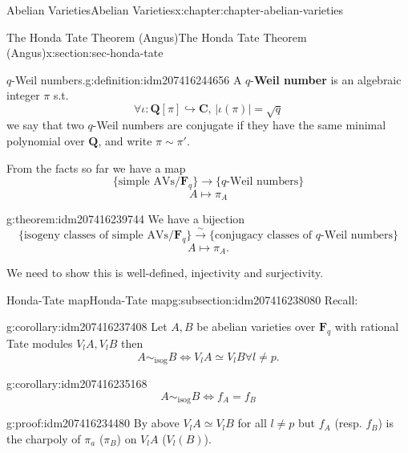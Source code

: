 \documentclass[oneside,10pt,]{book}
\newcommand{\terminology}[1]{\textbf{#1}}
\numberwithin{equation}{section}
\newcommand{\lb}{[}
\newcommand{\rb}{]}
\newcommand{\QQ}{\mathbf{Q}}
\newcommand{\CC}{\mathbf{C}}
\newcommand{\FF}{\mathbf{F}}
\begin{document}
\begin{chapterptx}{Abelian Varieties}{}{Abelian Varieties}{}{}{x:chapter:chapter-abelian-varieties}
\begin{sectionptx}{The Honda Tate Theorem (Angus)}{}{The Honda Tate Theorem (Angus)}{}{}{x:section:sec-honda-tate}
\begin{introduction}{}
\begin{definition}{\(q\)-Weil numbers.}{g:definition:idm207416244656}
A \(q\)-\terminology{Weil number} is an algebraic integer \(\pi\) s.t.%
\begin{equation*}
\forall \iota \colon \QQ\lb \pi\rb \hookrightarrow \CC,\,|\iota(\pi)| = \sqrt q
\end{equation*}
we say that two \(q\)-Weil numbers are conjugate if they have the same minimal polynomial over \(\QQ\), and write \(\pi \sim \pi'\).%
\end{definition}
From the facts so far we have a map%
\begin{equation*}
\{\text{simple AVs}/\FF_q\}\to \{q\text{-Weil numbers}\}
\end{equation*}
%
\begin{equation*}
A \mapsto \pi_A
\end{equation*}
%
\begin{theorem}{}{}{g:theorem:idm207416239744}%
We have a bijection%
\begin{equation*}
\{\text{isogeny classes of simple AVs}/\FF_q\}\xrightarrow{\sim} \{\text{conjugacy classes of }q\text{-Weil numbers}\}
\end{equation*}
%
\begin{equation*}
A \mapsto \pi_A\text{.}
\end{equation*}
%
\end{theorem}
We need to show this is well-defined, injectivity and surjectivity.%
\end{introduction}%
%
%
\typeout{************************************************}
\typeout{************************************************}
%
\begin{subsectionptx}{Honda-Tate map}{}{Honda-Tate map}{}{}{g:subsection:idm207416238080}
Recall:%
\begin{corollary}{}{}{g:corollary:idm207416237408}%
Let \(A,B\) be abelian varieties over \(\FF_q\) with rational Tate modules \(V_l A, V_lB\) then%
\begin{equation*}
A\sim_{\text{isog}} B \iff V_l A \simeq V_l B \forall l \ne p\text{.}
\end{equation*}
%
\end{corollary}
\begin{corollary}{}{}{g:corollary:idm207416235168}%
%
\begin{equation*}
A\sim_{\text{isog}} B \iff f_A = f_B
\end{equation*}
%
\end{corollary}
\begin{proofptx}{}{g:proof:idm207416234480}
By above \(V_l A \simeq V_lB\) for all \(l \ne p\) but \(f_A\) (resp. \(f_B\)) is the charpoly of \(\pi_a\) (\(\pi_B\)) on \(V_l A\) (\(V_l(B)\)).%

\end{proofptx}
\end{subsectionptx}
\end{sectionptx}
\end{chapterptx}
\end{document}

